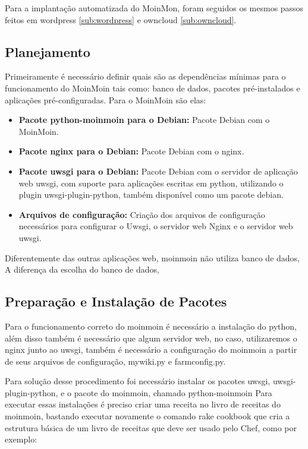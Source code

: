 Para a implantação automatizada do MoinMon, foram seguidos os mesmos passos
feitos em wordpress \ref{sub:wordpress} e owncloud \ref{sub:owncloud}.

\subsection{Planejamento}

Primeiramente é necessário definir quais são as dependências
mínimas para o funcionamento do MoinMoin tais como: banco de dados, pacotes
pré-instalados e aplicações pré-configuradas. Para o MoinMoin são elas:

\begin{itemize}
   \item \textbf{Pacote python-moinmoin para o Debian:} Pacote Debian com o MoinMoin.
   \item \textbf{Pacote nginx para o Debian:} Pacote Debian com o nginx.
   \item \textbf{Pacote uwsgi para o Debian:} Pacote Debian com o servidor de aplicação web
uwsgi, com suporte para aplicações escritas em python, utilizando o plugin uwsgi-plugin-python,
também disponível como um pacote debian.
   \item \textbf{Arquivos de configuração:} Criação dos arquivos de configuração
   necessários para configurar o Uwsgi, o servidor web Nginx e o servidor web
uwsgi.
\end{itemize}

Diferentemente das outras aplicações web, moinmoin não utiliza banco de dados,
A diferença da escolha do banco de dados,
\subsection{Preparação e Instalação de Pacotes}

Para o funcionamento correto do moinmoin é necessário a instalação do python, além
disso também é necessário que algum servidor web, no caso, utilizaremos o nginx
junto ao uwsgi, também é necessário a configuração do moinmoin a partir de seus
arquivos de configuração, mywiki.py e farmconfig.py.

Para solução desse procedimento foi necessário instalar os pacotes uwsgi,
uwsgi-plugin-python, e o pacote do moinmoin, chamado python-moinmoin
Para executar essas instalações é preciso criar uma receita no livro de receitas
do moinmoin, bastando executar novamente o comando rake cookbook que cria a
estrutura básica de um livro de receitas que deve ser usado pelo Chef, como por exemplo:

